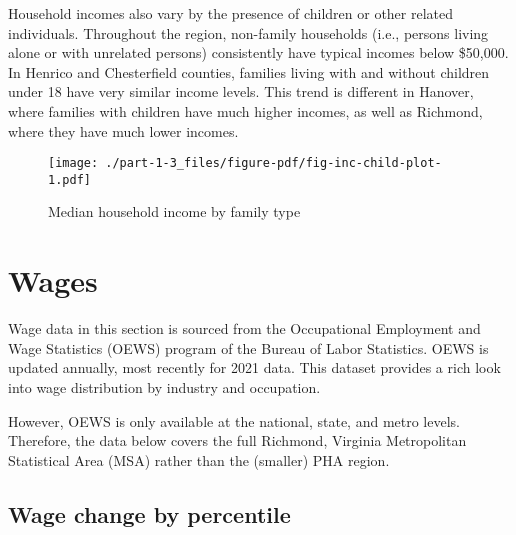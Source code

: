 \documentclass[
  letterpaper,
  DIV=11,
  numbers=noendperiod]{scrreprt}
\begin{document}
Household incomes also vary by the presence of children or other related
individuals. Throughout the region, non-family households (i.e., persons
living alone or with unrelated persons) consistently have typical
incomes below \$50,000. In Henrico and Chesterfield counties, families
living with and without children under 18 have very similar income
levels. This trend is different in Hanover, where families with children
have much higher incomes, as well as Richmond, where they have much
lower incomes.

\begin{figure}

{\centering \texttt{[image: ./part-1-3\_files/figure-pdf/fig-inc-child-plot-1.pdf]}

}

\caption{\label{fig-inc-child-plot}Median household income by family
type}

\end{figure}

\hypertarget{wages}{%
\section{Wages}\label{wages}}

\begin{tcolorbox}[enhanced jigsaw, colframe=quarto-callout-note-color-frame, arc=.35mm, bottomrule=.15mm, colbacktitle=quarto-callout-note-color!10!white, opacityback=0, left=2mm, rightrule=.15mm, title=\textcolor{quarto-callout-note-color}{\faInfo}\hspace{0.5em}{Note}, colback=white, coltitle=black, toptitle=1mm, leftrule=.75mm, titlerule=0mm, breakable, opacitybacktitle=0.6, toprule=.15mm, bottomtitle=1mm]

Wage data in this section is sourced from the Occupational Employment
and Wage Statistics (OEWS) program of the Bureau of Labor Statistics.
OEWS is updated annually, most recently for 2021 data. This dataset
provides a rich look into wage distribution by industry and occupation.

However, OEWS is only available at the national, state, and metro
levels. Therefore, the data below covers the full Richmond, Virginia
Metropolitan Statistical Area (MSA) rather than the (smaller) PHA
region.

\end{tcolorbox}

\hypertarget{wage-change-by-percentile}{%
\subsection{Wage change by percentile}\label{wage-change-by-percentile}}
\end{document}
